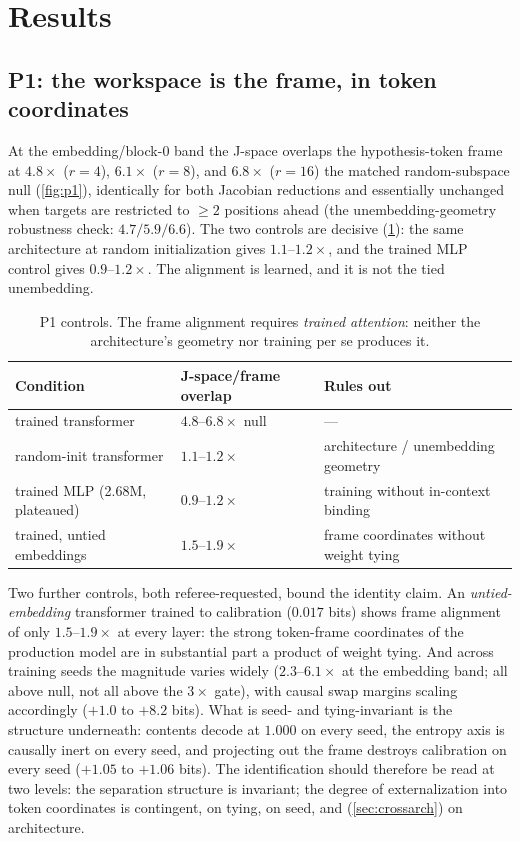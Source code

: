 \documentclass[11pt]{article}
\newcommand{\Jspace}{J\mbox{-}space}
\begin{document}
\section{Results}

\subsection{P1: the workspace is the frame, in token coordinates}

At the embedding/block-0 band the \Jspace{} overlaps the
hypothesis-token frame at $4.8\times$ ($r{=}4$), $6.1\times$ ($r{=}8$),
and $6.8\times$ ($r{=}16$) the matched random-subspace null
(\cref{fig:p1}), identically for both Jacobian reductions and essentially
unchanged when targets are restricted to ${\ge}2$ positions ahead (the
unembedding-geometry robustness check: $4.7/5.9/6.6$). The two controls
are decisive (\cref{tab:controls}): the same architecture at random
initialization gives $1.1$--$1.2\times$, and the trained MLP control
gives $0.9$--$1.2\times$. The alignment is learned, and it is not the
tied unembedding.

\begin{table}[h]
\centering
\small
\begin{tabular}{@{}lll@{}}
\toprule
\textbf{Condition} & \textbf{\Jspace{}/frame overlap} & \textbf{Rules out} \\
\midrule
trained transformer & $4.8$--$6.8\times$ null & --- \\
random-init transformer & $1.1$--$1.2\times$ & architecture / unembedding geometry \\
trained MLP (2.68M, plateaued) & $0.9$--$1.2\times$ & training without in-context binding \\
trained, untied embeddings & $1.5$--$1.9\times$ & frame coordinates without weight tying \\
\bottomrule
\end{tabular}
\caption{P1 controls. The frame alignment requires \emph{trained
attention}: neither the architecture's geometry nor training per se
produces it.}
\label{tab:controls}
\end{table}

Two further controls, both referee-requested, bound the identity
claim. An \emph{untied-embedding} transformer trained to calibration
($0.017$ bits) shows frame alignment of only $1.5$--$1.9\times$ at
every layer: the strong token-frame coordinates of the production
model are in substantial part a product of weight tying. And across
training seeds the magnitude varies widely ($2.3$--$6.1\times$ at the
embedding band; all above null, not all above the $3\times$ gate), with
causal swap margins scaling accordingly ($+1.0$ to $+8.2$ bits). What
is seed- and tying-invariant is the structure underneath: contents
decode at $1.000$ on every seed, the entropy axis is causally inert on
every seed, and projecting out the frame destroys calibration on every
seed ($+1.05$ to $+1.06$ bits). The identification should therefore be
read at two levels: the separation structure is invariant; the degree
of externalization into token coordinates is contingent, on tying, on
seed, and (\cref{sec:crossarch}) on architecture.
\end{document}
